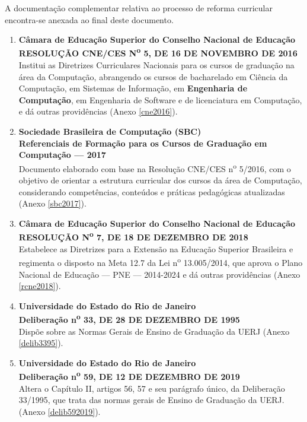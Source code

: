 A documentação complementar relativa ao processo de reforma curricular encontra-se anexada ao final deste documento.

\begin{enumerate}
      \item \textbf{Câmara de Educação Superior do Conselho Nacional de Educação}  \\
            \textbf{RESOLUÇÃO CNE/CES N\textsuperscript{o} 5, DE 16 DE NOVEMBRO DE 2016}  \\
            Institui as Diretrizes Curriculares Nacionais para os cursos de graduação na área da Computação, abrangendo os cursos de bacharelado em Ciência da Computação, em Sistemas de Informação, em \textbf{Engenharia de Computação}, em Engenharia de Software e de licenciatura em Computação, e dá outras providências (Anexo \ref{cne2016}).

      \item \textbf{Sociedade Brasileira de Computação (SBC)}  \\
            \textbf{Referenciais de Formação para os Cursos de Graduação em Computação –-- 2017} \\
            Documento elaborado com base na Resolução CNE/CES n\textsuperscript{o} 5/2016, com o objetivo de orientar a estrutura curricular dos cursos da área de Computação, considerando competências, conteúdos e práticas pedagógicas atualizadas (Anexo \ref{sbc2017}).

      \item \textbf{Câmara de Educação Superior do Conselho Nacional de Educação}  \\
            \textbf{RESOLUÇÃO N\textsuperscript{o} 7, DE 18 DE DEZEMBRO DE 2018}  \\
            Estabelece as Diretrizes para a Extensão na Educação Superior Brasileira e regimenta o disposto na Meta 12.7 da Lei n\textsuperscript{o} 13.005/2014, que aprova o Plano Nacional de Educação –-- PNE –-- 2014-2024 e dá outras providências (Anexo \ref{rcne2018}).

      \item \textbf{Universidade do Estado do Rio de Janeiro}  \\
            \textbf{Deliberação n\textsuperscript{o} 33, DE 28 DE DEZEMBRO DE 1995}  \\
            Dispõe sobre as Normas Gerais de Ensino de Graduação da UERJ (Anexo \ref{delib3395}).

      \item \textbf{Universidade do Estado do Rio de Janeiro}  \\
            \textbf{Deliberação n\textsuperscript{o} 59, DE 12 DE DEZEMBRO DE 2019}  \\
            Altera o Capítulo II, artigos 56, 57 e seu parágrafo único, da Deliberação 33/1995, que trata das normas gerais de Ensino de Graduação da UERJ. (Anexo \ref{delib592019}).


\end{enumerate}
